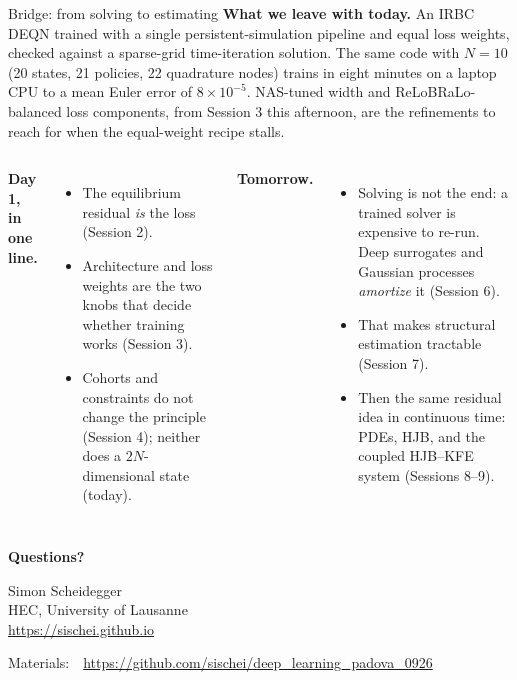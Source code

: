 \documentclass[aspectratio=169,11pt]{beamer}
\begin{document}
\begin{frame}{Bridge: from solving to estimating}
\footnotesize
\textbf{What we leave with today.}  An IRBC DEQN trained with a single persistent-simulation
pipeline and equal loss weights, checked against a sparse-grid time-iteration solution. The same code with $N = 10$ (20 states, 21 policies, 22 quadrature nodes) trains in eight minutes on a laptop CPU to a mean Euler error of $8 \times 10^{-5}$.
NAS-tuned width and ReLoBRaLo-balanced loss components, from Session 3 this
afternoon, are the refinements to reach for when the equal-weight recipe stalls.

\vspace{0.4em}
\begin{columns}[T]
\textbf{Day 1, in one line.}
\begin{itemize}
    \item The equilibrium residual \emph{is} the loss (Session 2).
    \item Architecture and loss weights are the two knobs that decide whether training works
          (Session 3).
    \item Cohorts and constraints do not change the principle (Session 4); neither does a
          $2N$-dimensional state (today).
\end{itemize}

\textbf{Tomorrow.}
\begin{itemize}
    \item Solving is not the end: a trained solver is expensive to re-run. Deep surrogates and
          Gaussian processes \emph{amortize} it (Session 6).
    \item That makes structural estimation tractable (Session 7).
    \item Then the same residual idea in continuous time: PDEs, HJB, and the coupled HJB--KFE
          system (Sessions 8--9).
\end{itemize}
\end{columns}
\end{frame}

\begin{frame}{}
\begin{center}
{\Huge \textcolor{uzhblue}{\textbf{Questions?}}}

\vspace{1.0cm}
{\large Simon Scheidegger}\\[4pt]
{\small HEC, University of Lausanne}\\[4pt]
\url{https://sischei.github.io}

\vspace{0.6cm}
{\small Materials:~~\url{https://github.com/sischei/deep_learning_padova_0926}}
\end{center}
\end{frame}
\end{document}
